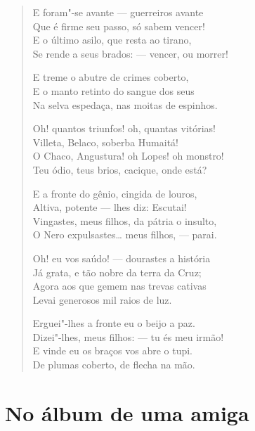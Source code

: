 \begin{verse}
E foram"-se avante --- guerreiros avante\\
Que é firme seu passo, só sabem vencer!\\
E o último asilo, que resta ao tirano,\\
Se rende a seus brados: --- vencer, ou morrer!

E treme o abutre de crimes coberto,\\
E o manto retinto do sangue dos seus\\
Na selva espedaça, nas moitas de espinhos.

Oh! quantos triunfos! oh, quantas vitórias!\\
Villeta, Belaco, soberba Humaitá!\\
O Chaco, Angustura! oh Lopes! oh monstro!\\
Teu ódio, teus brios, cacique, onde está?

E a fronte do gênio, cingida de louros,\\
Altiva, potente --- lhes diz: Escutai!\\
Vingastes, meus filhos, da pátria o insulto,\\
O Nero expulsastes\ldots{} meus filhos, --- parai.

Oh! eu vos saúdo! --- dourastes a história\\
Já grata, e tão nobre da terra da Cruz;\\
Agora aos que gemem nas trevas cativas\\
Levai generosos mil raios de luz.

Erguei"-lhes a fronte eu o beijo a paz.\\
Dizei"-lhes, meus filhos: --- tu és meu irmão!\\
E vinde eu os braços vos abre o tupi.\\
De plumas coberto, de flecha na mão.
\end{verse}

\chapter{No álbum de uma amiga}

